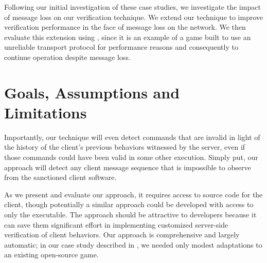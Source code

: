 Following our initial investigation of these case studies, we
investigate the impact of message loss on our verification technique.
We extend our technique to improve verification performance in the
face of message loss on the network.  We then evaluate this extension
using \xpilot, since it is an example of a game built to use an
unreliable transport protocol for performance reasons and consequently
to continue operation despite message loss.

\section{Goals, Assumptions and Limitations}
\label{sec:scv:background}

Importantly, our technique will even detect commands that are invalid
in light of the history of the client's previous behaviors witnessed
by the server, even if those commands could have been valid in
some other execution.  Simply put, our approach will detect any client
message sequence that is impossible to observe from the sanctioned client
software.

As we present and evaluate our approach, it requires
access to source code for the client, though potentially a similar
approach could be developed with access to only the executable.
The approach should be attractive to developers because it can
save them significant effort in implementing customized server-side
verification of client behaviors.  Our approach is comprehensive and
largely automatic; in our case study described in ,
we needed only modest adaptations to an existing open-source game.

